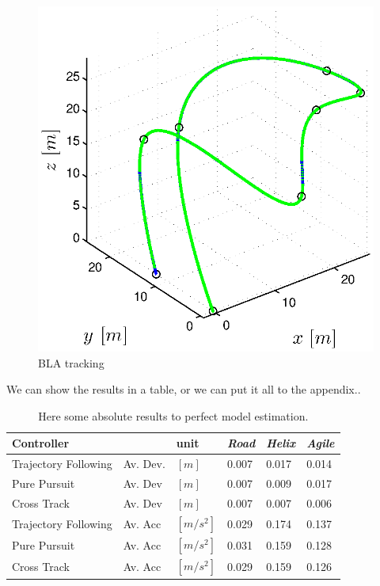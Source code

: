 \begin{figure}[h]
\begin{minipage}[t]{0.32\textwidth}
    \includegraphics[width = \textwidth]{trackings/figure_3D_agile_SplineDegree3_crossTrack_Disturbance_0}
  \end{minipage}
  \caption{BLA tracking }
  \label{fig:results_perfect_model}
\end{figure}

We can show the results in a table, or we can put it all to the appendix..

\begin{table}[h]
\begin{center}
 \begin{tabular}{lll|lll}
 \hline
 Controller &   & unit & \textit{Road} & \textit{Helix} & \textit{Agile} \\ \hline \hline
 Trajectory Following & Av. Dev. & $[m]$ & 0.007 & 0.017 & 0.014 \\
 Pure Pursuit         & Av. Dev & $[m]$ & 0.007 & 0.009 & 0.017 \\
 Cross Track          & Av. Dev & $[m]$ &  0.007 & 0.007 & 0.006 \\
    
 Trajectory Following & Av. Acc & $[m/s^2]$ & 0.029 & 0.174 & 0.137 \\
 Pure Pursuit         & Av. Acc & $[m/s^2]$ & 0.031 & 0.159 & 0.128 \\
 Cross Track          & Av. Acc & $[m/s^2]$ & 0.029 & 0.159 & 0.126 \\
 \hline
 \end{tabular}
 \caption{Here some absolute results to perfect model estimation.}\vspace{1ex}
 \label{tab:results_perfect_model}
\end{center}
\end{table}

